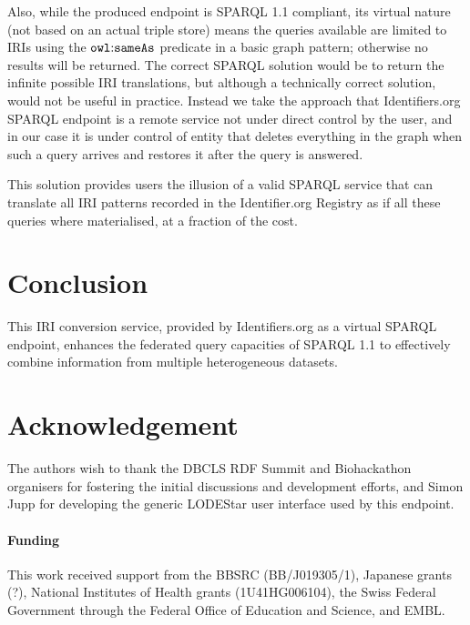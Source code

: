 \documentclass{bioinfo}
\begin{document}

Also, while the produced endpoint is SPARQL 1.1 compliant, its virtual nature (not based on an actual triple store) means the queries available are limited to IRIs using the $\mathtt{owl\text{\rm :}{}sameAs}$ predicate in a basic graph pattern; otherwise no results will be returned. The correct SPARQL solution would be to return the infinite possible IRI translations, but although a technically correct solution, would not be useful in practice. Instead we take the approach that Identifiers.org SPARQL endpoint is a remote service not under direct control by the user, and in our case it is under control of entity that deletes everything in the graph when such a query arrives and restores it after the query is answered.

This solution provides users the illusion of a valid SPARQL service that can translate all IRI patterns recorded in the Identifier.org Registry as if all these queries where materialised, at a fraction of the cost.

\section{Conclusion}
This IRI conversion service, provided by Identifiers.org as a virtual SPARQL endpoint, enhances the federated query capacities of SPARQL 1.1 to effectively combine information from multiple heterogeneous datasets.

\section*{Acknowledgement}
The authors wish to thank the DBCLS RDF Summit and Biohackathon organisers for fostering the initial discussions and development efforts, and Simon Jupp for developing the generic LODEStar user interface used by this endpoint.

\paragraph{Funding\textcolon} This work received support from the BBSRC (BB/J019305/1), Japanese grants (?), National Institutes of Health grants (1U41HG006104), the Swiss Federal Government through the Federal Office of Education and Science, and EMBL.  


%
%
%
%
%
%
%
%
  
\end{document}
